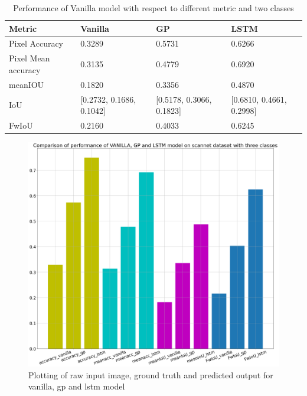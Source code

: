 	\begin{table}[h]
		\begin{center}
			\begin{tabular}{ | l | l | l | p{4cm} |}
				\hline
				
				\cellcolor{purple!30}Metric & \cellcolor{purple!30}Vanilla & \cellcolor{purple!30}GP & \cellcolor{purple!30}LSTM\\ \hline
				Pixel Accuracy & 0.3289 & 0.5731 & 0.6266 \\ \hline
				Pixel Mean accuracy & 0.3135 & 0.4779 & 0.6920 \\ \hline
				meanIOU & 0.1820 & 0.3356 & 0.4870 \\ \hline
				IoU & [0.2732, 0.1686, 0.1042] & [0.5178, 0.3066, 0.1823] & [0.6810, 0.4661, 0.2998] \\ \hline
				FwIoU & 0.2160 & 0.4033 & 0.6245 \\ \hline
				\hline
			\end{tabular}
			\caption{Performance of Vanilla model with respect to different metric and two classes}
			\label{table:unet_scannet_three_classes}
		\end{center}
	\end{table}	
	
	\begin{figure}
		\centering
		\includegraphics[width=12cm]{images/scannet_performance_three_classes.png}
		\caption{Plotting of raw input image, ground truth and predicted output for vanilla, gp and lstm model}
		\label{fig:performance_metric_three_classes_unet}
	\end{figure}

